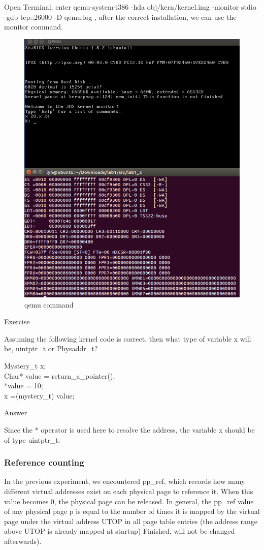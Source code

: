 Open Terminal, enter qemu-system-i386 -hda obj/kern/kernel.img -monitor stdio -gdb tcp::26000 -D qemu.log , after the correct installation, we can use the monitor command.
\begin{figure}[H]
\centering
\includegraphics[width=0.8\linewidth]{figure/qemu_commond}
\caption{qemu command}
\end{figure}

\begin{flushleft}
{\Large Exercise}
\end{flushleft}

Assuming the following kernel code is correct, then what type of variable x will be, uintptr\_t or
Physaddr\_t?
\begin{flushleft}
Mystery\_t x;\\
Char* value = return\_a\_pointer();\\
*value = 10; \\
x =(mystery\_t) value;\\
\end{flushleft}
\begin{flushleft}
{\Large Answer}
\end{flushleft}

Since the * operator is used here to resolve the address, the variable x should be of type uintptr\_t.

\subsubsection{Reference counting}
In the previous experiment, we encountered pp\_ref, which records how many different virtual addresses exist on each physical page to reference it. When this value becomes 0, the physical page can be released. In general, the pp\_ref value of any physical page p is equal to the number of times it is mapped by the virtual page under the virtual address UTOP in all page table entries (the address range above UTOP is already mapped at startup) Finished, will not be changed afterwards).

